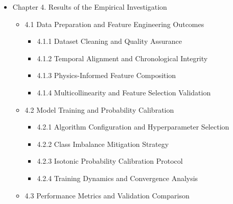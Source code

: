 \begin{itemize}
  \begin{itemize}
  \tightlist
  \item
    3.1 Datasets and Data Sources

    \begin{itemize}
    \tightlist
    \item
      3.1.1 Data Collection and Source Description
    \item
      3.1.2 Variable Taxonomy and Operational Mapping
    \item
      3.1.3 Data Quality Assessment and Preprocessing Protocol
    \end{itemize}
  \item
    3.2 Experimental Design and Protocol

    \begin{itemize}
    \tightlist
    \item
      3.2.1 System Architecture and Pipeline Overview
    \item
      3.2.2 Feature Engineering Strategy
    \item
      3.2.3 Model Selection and Training Protocol
    \item
      3.2.4 Validation Framework and Evaluation Metrics
    \end{itemize}
  \end{itemize}
\item
  Chapter 4. Results of the Empirical Investigation

  \begin{itemize}
  \tightlist
  \item
    4.1 Data Preparation and Feature Engineering Outcomes

    \begin{itemize}
    \tightlist
    \item
      4.1.1 Dataset Cleaning and Quality Assurance
    \item
      4.1.2 Temporal Alignment and Chronological Integrity
    \item
      4.1.3 Physics-Informed Feature Composition
    \item
      4.1.4 Multicollinearity and Feature Selection Validation
    \end{itemize}
  \item
    4.2 Model Training and Probability Calibration

    \begin{itemize}
    \tightlist
    \item
      4.2.1 Algorithm Configuration and Hyperparameter Selection
    \item
      4.2.2 Class Imbalance Mitigation Strategy
    \item
      4.2.3 Isotonic Probability Calibration Protocol
    \item
      4.2.4 Training Dynamics and Convergence Analysis
    \end{itemize}
  \item
    4.3 Performance Metrics and Validation Comparison


\end{itemize}
\end{itemize}
